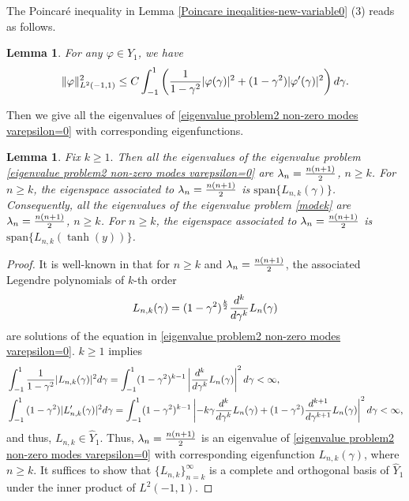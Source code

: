 \documentclass[1 [leqno, 11pt]{amsart}
\numberwithin{equation}{section}
\newtheorem{lemma}[Theorem]{Lemma}
\begin{document}
\begin{CJK*}{GBK}{song}
 The Poincar\'e inequality in Lemma \ref{Poincare ineqalities-new-variable0} (3) reads as follows.
\begin{lemma}\label{Poincare inequalities compact embedding result new variables k mode}
For any $\varphi \in \hat{Y}_1$, we have
\begin{align*}
 \|\varphi\|^2_{L^2(-1,1)}   \leq C\int_{-1}^1\left({1\over1-\gamma^2}|\varphi(\gamma)|^2+(1-\gamma^2)|\varphi'(\gamma)|^2\right)d\gamma.
\end{align*}
\end{lemma}
Then we give all the eigenvalues of \eqref{eigenvalue problem2 non-zero modes varepsilon=0} with corresponding eigenfunctions.
\begin{lemma}\label{sol to eigenvalue problem non-zero modes varepsilon=0 original} Fix $k\geq1.$ Then
all the eigenvalues  of the eigenvalue problem \eqref{eigenvalue problem2 non-zero modes varepsilon=0} are $\lambda_n={n(n+1)\over2}$, $n\geq k$. For $n\geq k$, the eigenspace associated to $\lambda_n={n(n+1)\over2}$ is $\text{span}\{L_{n,k}(\gamma)\}$.
Consequently, all the eigenvalues  of the eigenvalue problem \eqref{modek} are $\lambda_n={n(n+1)\over2}$, $n\geq k$. For $n\geq k$, the eigenspace associated to $\lambda_n={n(n+1)\over2}$ is $\text{span}\{L_{n,k}(\tanh(y))\}$.
\end{lemma}
\begin{proof}
It is well-known in \cite{Courant-Hilbert53} that for $n\geq k$ and $\lambda_n={n(n+1)\over2}$, the associated Legendre polynomials of $k$-th order  \begin{equation}\nonumber
L_{n,k}(\gamma)=(1-\gamma^2)^{k\over2}{d^k\over d\gamma^k}L_n(\gamma)
\end{equation}
are   solutions of the equation in \eqref{eigenvalue problem2 non-zero modes varepsilon=0}.
$k\geq1$ implies
\begin{equation*}\begin{aligned}
&\int_{-1}^1{1\over 1-\gamma^2}|L_{n,k}(\gamma)|^2d\gamma=\int_{-1}^1(1-\gamma^2)^{k-1}\left|{d^k\over d\gamma^k}L_n(\gamma)\right|^2d\gamma<\infty,\\
&\int_{-1}^1{ (1-\gamma^2)}|L'_{n,k}(\gamma)|^2d\gamma=\int_{-1}^1(1-\gamma^2)^{k-1}\left|-k\gamma{d^k\over d\gamma^k}L_n(\gamma)+(1-\gamma^2){d^{k+1}\over d\gamma^{k+1}}L_n(\gamma)\right|^2d\gamma<\infty,
\end{aligned}\end{equation*}
and thus, $L_{n,k}\in \hat Y_1$. Thus, $\lambda_n={n(n+1)\over2}$ is an eigenvalue of \eqref{eigenvalue problem2 non-zero modes varepsilon=0} with corresponding eigenfunction  $L_{n,k}(\gamma)$, where $n\geq k$. It suffices to show that $\{L_{n,k}\}_{n=k}^\infty$ is a complete and orthogonal basis of $\hat Y_1$ under the inner product of  $L^2(-1,1)$.

\end{proof}
\end{CJK*}
\end{document}
